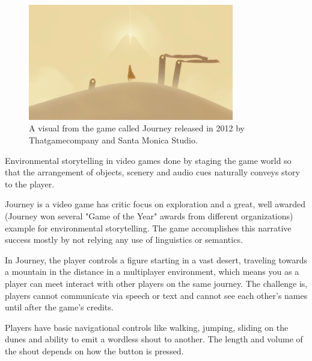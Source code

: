             \begin{figure}[H]
                \centering
                \includegraphics[width=0.8\textwidth]{images/journey.jpg}
                \caption{A visual from the game called Journey released in 2012 by Thatgamecompany and Santa Monica Studio.}
                \label{fig:JOURNEY}
            \end{figure}

            Environmental storytelling in video games done by staging the game world so that the arrangement of objects, scenery and audio cues naturally conveys story to the player\cite{BioShock_Infinite}.\par

            Journey is a video game has critic focus on exploration and a great, well awarded (Journey won several "Game of the Year" awards from different organizations) example for environmental storytelling. The game accomplishes this narrative success mostly by not relying any use of linguistics or semantics.\par

            In Journey, the player controls a figure starting in a vast desert, traveling towards a mountain in the distance in a multiplayer environment, which means you as a player can meet interact with other players on the same journey. The challenge is, players cannot communicate via speech or text and cannot see each other's names until after the game's credits.\par

            Players have basic navigational controls like walking, jumping, sliding on the dunes and ability to emit a wordless shout to another. The length and volume of the shout depends on how the button is pressed.\par

